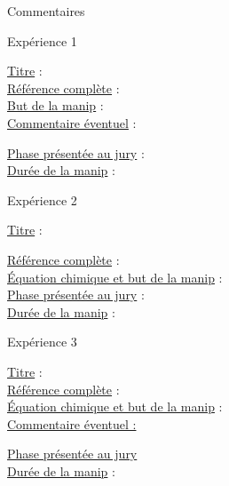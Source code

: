 \begin{reportBlock}{Commentaires}

\end{reportBlock}


\begin{reportBlock}{Expérience 1}

\underline{Titre} :  \\

\underline{Référence complète} :  \\ 

\underline{But de la manip} : \\

\underline{Commentaire éventuel} : 

\underline{Phase présentée au jury} :\\

\underline{Durée de la manip} : \\

\end{reportBlock}



\begin{reportBlock}{Expérience 2}

\underline{Titre} : 

\underline{Référence complète} :  \\ 

\underline{Équation chimique et but de la manip} : \\

\underline{Phase présentée au jury} :  \\

\underline{Durée de la manip} : \\

\end{reportBlock}


\begin{reportBlock}{Expérience 3}

\underline{Titre} : \\

\underline{Référence complète} : \\ 

\underline{Équation chimique et but de la manip} :  \\


\underline{Commentaire éventuel :} 

\underline{Phase présentée au jury} \\

\underline{Durée de la manip} :  \\

\end{reportBlock}



